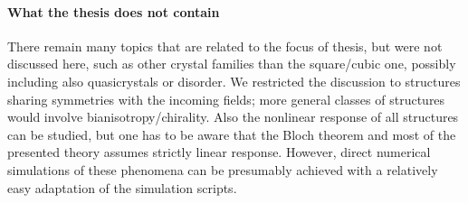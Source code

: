 




%	  

\paragraph{What the thesis does not contain} 
There remain many topics that are related to the focus of thesis, but were not discussed here, such as other crystal families than the square/cubic one, possibly including also quasicrystals or disorder. We restricted the discussion to structures sharing symmetries with the incoming fields; more general classes of structures would involve bianisotropy/chirality. Also the nonlinear response of all structures can be studied, but one has to be aware that the Bloch theorem and most of the presented theory assumes strictly linear response. However, direct numerical simulations of these phenomena can be presumably  achieved with a relatively easy adaptation of the simulation scripts.

